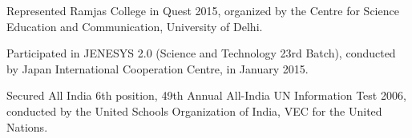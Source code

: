 \begin{itemize}[noitemsep]
{
\item Represented Ramjas College in Quest 2015, organized by the Centre for Science Education and Communication, University of Delhi.
\item Participated in JENESYS 2.0 (Science and Technology 23rd Batch), conducted by Japan International Cooperation Centre, in January 2015.
\item Secured All India 6th position, 49th Annual All-India UN Information Test 2006, conducted by the United Schools Organization of India, VEC for the United Nations.
}\end{itemize}